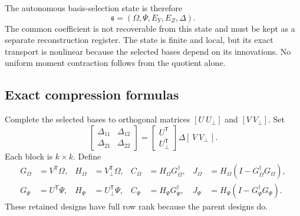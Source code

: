 \documentclass[11pt,oneside,openany,a4paper]{book}
\numberwithin{equation}{chapter}
\theoremstyle{definition}
\theoremstyle{remark}
\newcommand{\T}{\mathsf T}\newcommand{\Id}{I}
\begin{document}
The autonomous basis-selection state is therefore
\begin{equation}\label{base:eq:quotient-state}
 \mathfrak s=(\Omega,\Psi,E_Y,E_Z,\Delta).
\end{equation}
The common coefficient is not recoverable from this state and must be kept
as a separate reconstruction register. The state is finite and local, but
its exact transport is nonlinear because the selected bases depend on its
innovations. No uniform moment contraction follows from the quotient alone.

\subsection{Exact compression formulas}\label{base:subsec:quotient-compression}
Complete the selected bases to orthogonal matrices
$[U\ U_\perp]$ and $[V\ V_\perp]$. Set
\begin{equation}\label{base:eq:delta-blocks}
 \begin{bmatrix}\Delta_{11}&\Delta_{12}\\
                 \Delta_{21}&\Delta_{22}\end{bmatrix}
 =\begin{bmatrix}U^{\T}\\ U_\perp^{\T}\end{bmatrix}
    \Delta[\,V\ V_\perp\,].
\end{equation}
Each block is $k\times k$. Define
\begin{align}
 G_\Omega&=V^{\T}\Omega,& H_\Omega&=V_\perp^{\T}\Omega,&
 C_\Omega&=H_\Omega G_\Omega^\dagger,&
 J_\Omega&=H_\Omega(I-G_\Omega^\dagger G_\Omega),\label{base:eq:Omega-split}\\
 G_\Psi&=U^{\T}\Psi,& H_\Psi&=U_\perp^{\T}\Psi,&
 C_\Psi&=H_\Psi G_\Psi^\dagger,&
 J_\Psi&=H_\Psi(I-G_\Psi^\dagger G_\Psi).\label{base:eq:Psi-split}
\end{align}
These retained designs have full row rank because the parent designs do.
\end{document}
